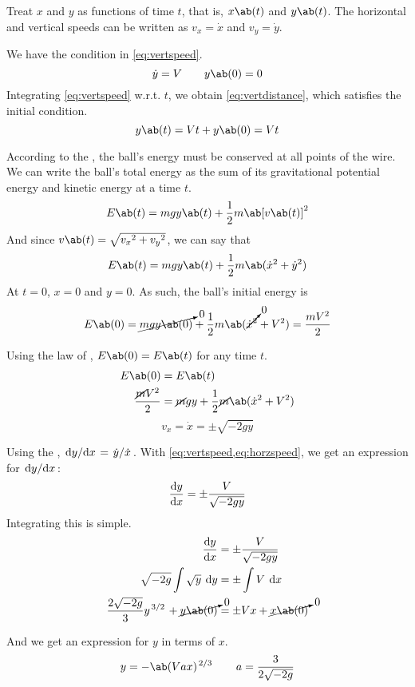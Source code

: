 Treat \(x\) and \(y\) as functions of time \(t\), that is,
\(x\ab(t)\) and \(y\ab(t)\). The horizontal and vertical speeds can
be written as \(v_x = \dot{x}\) and \(v_y = \dot{y}\).

We have the condition in \cref{eq:vertspeed}.
\begin{equation}
  \dot{y} = V\qquad y\ab(0) = 0
  \label{eq:vertspeed}
\end{equation}
Integrating \cref{eq:vertspeed} w.r.t. \(t\), we obtain
\cref{eq:vertdistance}, which satisfies the initial condition.
\begin{equation}
  y\ab(t) = Vt + y\ab(0) = Vt
  \label{eq:vertdistance}
\end{equation}

According to the , the ball's
energy must be conserved at all points of the wire. We can write the
ball's total energy as the sum of its gravitational potential energy
and kinetic energy at a time \(t\).
\begin{equation*}
  E\ab(t) = mgy\ab(t) + \f{1}{2}m\ab[v\ab(t)]^2
\end{equation*}
And since \(v\ab(t) = \sqrt{{v_x}^2 + {v_y}^2}\), we can say that
\begin{equation}
  E\ab(t) = mgy\ab(t) + \f{1}{2}m\ab(\dot{x}^2 + \dot{y}^2)
\end{equation}
At \(t = 0\), \(x = 0\) and \(y = 0\). As such, the ball's initial energy is
\begin{align*}
  E\ab(0) = \cancelto{0}{mgy\ab(0)} +
  \f{1}{2}m\ab(\cancelto{0}{\dot{x}^2} + V^2)
  = \f{mV^2}{2}
\end{align*}

Using the law of , \(E\ab(0) = E\ab(t)\)
for any time \(t\).
\begin{align*}
  E\ab(0) &= E\ab(t)\\
  \f{\cancel{m}V^2}{2} &= \cancel{m}gy + \f{1}{2}\cancel{m}\ab(\dot{x}^2 + V^2)
\end{align*}
\begin{equation}
  \label{eq:horzspeed}
  v_x = \dot{x} = \pm\sqrt{-2gy}
\end{equation}

Using the , \(\odv{y}/{x} = \lf{\dot{y}}{\dot{x}}\).
With \cref{eq:vertspeed,eq:horzspeed}, we get an expression for \(\odv{y}/{x}\):
\begin{equation}
  \odv{y}{x} = \pm\f{V}{\sqrt{-2gy}}
\end{equation}
Integrating this is simple.
\begin{align*}
  \odv{y}{x} &= \pm\f{V}{\sqrt{-2gy}} \\
  \sqrt{-2g}\int\sqrt{y}\:\odif{y} &= \pm\int V\:\odif{x}  \\
  \f{2\sqrt{-2g}}{3}y^{\lf{3}{2}} + \cancelto{0}{y\ab(0)} &= \pm Vx +
  \cancelto{0}{x\ab(0)}
\end{align*}

And we get an expression for \(y\) in terms of \(x\).
\begin{equation}
  y = -\ab(Vax)^{\lf{2}{3}}\qquad a = \f{3}{2\sqrt{-2g}}
\end{equation}

